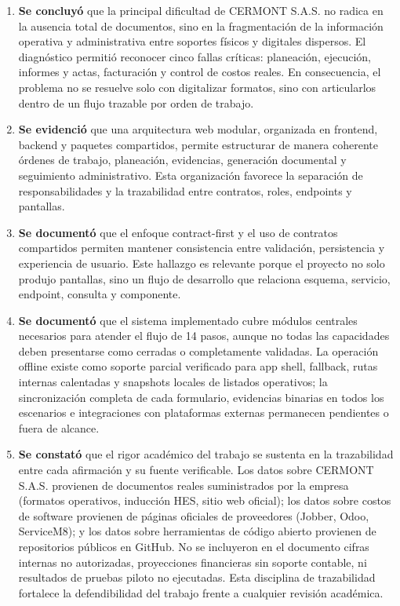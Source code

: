 \begin{enumerate}
  \item \textbf{Se concluyó} que la principal dificultad de CERMONT S.A.S. no radica en la ausencia total de documentos, sino en la fragmentación de la información operativa y administrativa entre soportes físicos y digitales dispersos. El diagnóstico permitió reconocer cinco fallas críticas: planeación, ejecución, informes y actas, facturación y control de costos reales. En consecuencia, el problema no se resuelve solo con digitalizar formatos, sino con articularlos dentro de un flujo trazable por orden de trabajo.

  \item \textbf{Se evidenció} que una arquitectura web modular, organizada en frontend, backend y paquetes compartidos, permite estructurar de manera coherente órdenes de trabajo, planeación, evidencias, generación documental y seguimiento administrativo. Esta organización favorece la separación de responsabilidades y la trazabilidad entre contratos, roles, endpoints y pantallas.

  \item \textbf{Se documentó} que el enfoque contract-first y el uso de contratos compartidos permiten mantener consistencia entre validación, persistencia y experiencia de usuario. Este hallazgo es relevante porque el proyecto no solo produjo pantallas, sino un flujo de desarrollo que relaciona esquema, servicio, endpoint, consulta y componente.

  \item \textbf{Se documentó} que el sistema implementado cubre módulos centrales necesarios para atender el flujo de 14 pasos, aunque no todas las capacidades deben presentarse como cerradas o completamente validadas. La operación offline existe como soporte parcial verificado para app shell, fallback, rutas internas calentadas y snapshots locales de listados operativos; la sincronización completa de cada formulario, evidencias binarias en todos los escenarios e integraciones con plataformas externas permanecen pendientes o fuera de alcance.

  \item \textbf{Se constató} que el rigor académico del trabajo se sustenta en la trazabilidad entre cada afirmación y su fuente verificable. Los datos sobre CERMONT S.A.S. provienen de documentos reales suministrados por la empresa (formatos operativos, inducción HES, sitio web oficial); los datos sobre costos de software provienen de páginas oficiales de proveedores (Jobber, Odoo, ServiceM8); y los datos sobre herramientas de código abierto provienen de repositorios públicos en GitHub. No se incluyeron en el documento cifras internas no autorizadas, proyecciones financieras sin soporte contable, ni resultados de pruebas piloto no ejecutadas. Esta disciplina de trazabilidad fortalece la defendibilidad del trabajo frente a cualquier revisión académica.


\end{enumerate}
